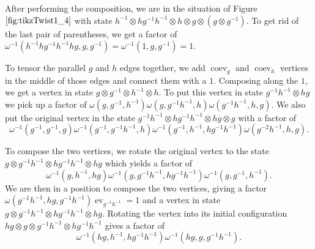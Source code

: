 \documentclass{amsart}
\DeclareMathOperator{\coev}{coev}
\DeclareMathOperator{\ev}{ev}
\begin{document}
After performing the composition, we are in the situation of Figure $\ref{fig:tikzTwist1_4}$ with state $h^{-1} \otimes hg^{-1}h^{-1} \otimes h \otimes g \otimes (g \otimes g^{-1})$.  To get rid of the last pair of parentheses, we get a factor of $\omega^{-1}(h^{-1}hg^{-1}h^{-1}hg, g, g^{-1}) = \omega^{-1}(1, g, g^{-1}) = 1$.   

To tensor the parallel $g$ and $h$ edges together, we add $\coev_g$ and $\coev_h$ vertices in the middle of those edges and connect them with a $1$.  Composing along the $1$, we get a vertex in state $g \otimes g^{-1} \otimes h^{-1} \otimes h$.  To put this vertex in state $g^{-1}h^{-1} \otimes hg$ we pick up a factor of $\omega(g, g^{-1}, h^{-1}) \omega(g, g^{-1}h^{-1}, h) \omega(g^{-1}h^{-1}, h, g)$.   We also put the original vertex in the state $g^{-1}h^{-1} \otimes hg^{-1}h^{-1} \otimes hg \otimes g$ with a factor of
$$\omega^{-1}(g^{-1}, g^{-1}, g) \omega^{-1}(g^{-1}, g^{-1}h^{-1}, h) \omega^{-1}(g^{-1}, h^{-1}, hg^{-1}h^{-1}) \omega(g^{-2}h^{-1}, h, g). $$

To compose the two vertices, we rotate the original vertex to the state $g  \otimes g^{-1}h^{-1}  \otimes hg^{-1}h^{-1} \otimes hg$ which yields a factor of 
$$\omega^{-1}(g, h^{-1}, hg) \omega^{-1}(g, g^{-1}h^{-1}, hg^{-1}h^{-1}) \omega^{-1}(g, g^{-1}, h^{-1}).$$
We are then in a position to compose the two vertices, giving a factor 
$\omega(g^{-1}h^{-1}, hg, g^{-1}h^{-1})  \ev_{g^{-1}h^{-1}} = 1$ and a vertex in state $g \otimes g^{-1}h^{-1} \otimes hg^{-1}h^{-1} \otimes hg$.  Rotating the vertex into its initial configuration $hg \otimes g \otimes  g^{-1}h^{-1} \otimes hg^{-1}h^{-1}$ gives a factor 
of 
$$\omega^{-1}(hg, h^{-1}, hg^{-1}h^{-1}) \omega^{-1}(hg, g, g^{-1}h^{-1}).$$
\end{document}
